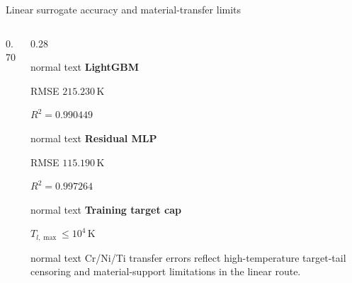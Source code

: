 \documentclass[aspectratio=169,10pt]{beamer}
\begin{document}
\begin{frame}[t]{Linear surrogate accuracy and material-transfer limits}
  \vspace{-0.16cm}
  \begin{columns}[T,totalwidth=0.98\textwidth]
    \begin{column}{0.70\textwidth}
      \centering
    \end{column}
    \begin{column}{0.28\textwidth}
      \begin{beamercolorbox}[wd=\linewidth,sep=0.50em]{normal text}
        \scriptsize
        \textbf{\color{GVSourceBlue}LightGBM}\par
        RMSE \(215.230\,\mathrm K\)\par
        \(R^2=0.990449\)
      \end{beamercolorbox}
      \vspace{0.13cm}
      \begin{beamercolorbox}[wd=\linewidth,sep=0.50em]{normal text}
        \scriptsize
        \textbf{\color{GVCouplingOrange}Residual MLP}\par
        RMSE \(115.190\,\mathrm K\)\par
        \(R^2=0.997264\)
      \end{beamercolorbox}
      \vspace{0.13cm}
      \begin{beamercolorbox}[wd=\linewidth,sep=0.48em]{normal text}
        \scriptsize
        \textbf{\color{GVTitleRed}Training target cap}\par
        \(T_{l,\max}\leq10^4\,\mathrm K\)
      \end{beamercolorbox}
      \vspace{0.13cm}
      \begin{beamercolorbox}[wd=\linewidth,sep=0.50em]{normal text}
        \scriptsize\color{GVSlate}
        Cr/Ni/Ti transfer errors reflect high-temperature target-tail censoring and material-support limitations in the linear route.
      \end{beamercolorbox}
    \end{column}
  \end{columns}
\end{frame}
\end{document}
